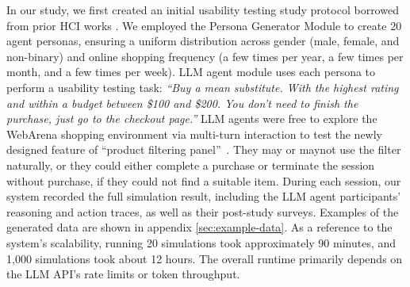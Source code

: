 \documentclass[manuscript,review,anonymous]{acmart}
\begin{document}
In our study, we first created an initial usability testing study protocol borrowed from prior HCI works \cite{Moser2017, prakash2024}.
We employed the Persona Generator Module to create 20 agent personas, ensuring a uniform distribution across gender (male, female, and non-binary) and online shopping frequency (a few times per year, a few times per month, and a few times per week). 
LLM agent module uses each persona to perform a usability testing task: \textit{``Buy a mean substitute. With the highest rating and within a budget between \$100 and \$200. You don't need to finish the purchase, just go to the checkout page.''}
LLM agents were free to explore the WebArena shopping environment via multi-turn interaction to test the newly designed feature of ``product filtering panel''~\cite{zhouWebArenaRealisticWeb2024}.  
They may or maynot use the filter naturally, or they could either complete a purchase or terminate the session without purchase, if they could not find a suitable item.
During each session, our system recorded the full simulation result, including the LLM agent participants' reasoning and action traces, as well as their post-study surveys.
Examples of the generated data are shown in appendix \ref{sec:example-data}.
As a reference to the system's scalability, running 20 simulations took approximately 90 minutes, and 1,000 simulations took about 12 hours.
The overall runtime primarily depends on the LLM API's rate limits or token throughput.
\end{document}
